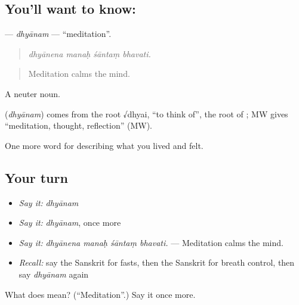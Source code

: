 \subsection*{You'll want to know: }
\textbf{} — \emph{dhyānam} — \textquotedblleft{}meditation\textquotedblright{}.

\begin{quote}
   
\end{quote}

\begin{quote}
\emph{dhyānena manaḥ śāntaṃ bhavati.}
\end{quote}

\begin{quote}
Meditation calms the mind.
\end{quote}

A neuter noun.

\begin{cousinweb}
\textbf{} (\emph{dhyānam}) comes from the root √dhyai, \textquotedblleft{}to think of\textquotedblright{}, the root of \textbf{}; MW gives \textquotedblleft{}meditation, thought, reflection\textquotedblright{} (MW).
\end{cousinweb}

\begin{grammarlens}[title={What you've built}]
One more word for describing what you lived and felt.
\end{grammarlens}

\subsection*{Your turn}
\begin{itemize}
\raggedright
  \item \emph{Say it:} \emph{dhyānam}
  \item \emph{Say it:} \emph{dhyānam}, once more
  \item \emph{Say it:} \emph{dhyānena manaḥ śāntaṃ bhavati.} — Meditation calms the mind.
  \item \emph{Recall:} say the Sanskrit for fasts, then the Sanskrit for breath control, then say \emph{dhyānam} again
\end{itemize}

\begin{tcolorbox}[breakable,colback=teal!4,colframe=teal!35!black,title={Before you move on}]
What does  mean? (\textquotedblleft{}Meditation\textquotedblright{}.) Say it once more.
\end{tcolorbox}
